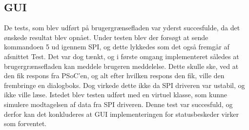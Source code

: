 \subsection{GUI}

De tests, som blev udført på brugergrænsefladen var yderst succesfulde, da det ønskede resultat blev opnået. Under testen blev der forsøgt at sende kommandoen 5 
ud igennem SPI, og dette lykkedes som det også fremgår af afsnittet Test.  Det var dog tænkt, og i første omgang implementeret således at brugergrænsefladen kan 
meddele brugeren meddelelse. Dette skulle ske, ved at den fik respons fra PSoC’en, og alt efter hvilken respons den fik, ville den frembringe en dialogboks. Dog 
virkede dette ikke da SPI driveren var ustabil, og ikke ville læse. Istedet blev testen udført med en virtuel klasse, som kunne simulere modtagelsen af data
fra SPI driveren. Denne test var succesfuld, og derfor kan det konkluderes at GUI implementeringen for statusbeskeder virker som forventet.
